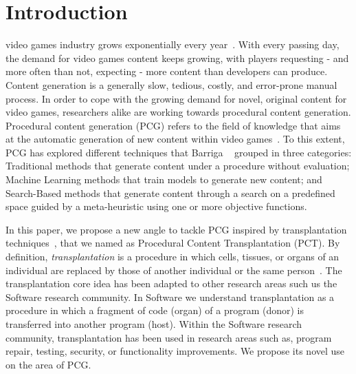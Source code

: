 \section{Introduction}

 video games industry grows exponentially every year~\cite{rykala2020growth}. With every passing day, the demand for video games content keeps growing, with players requesting - and more often than not, expecting - more content than developers can produce. Content generation is a generally slow, tedious, costly, and error-prone manual process. 
In order to cope with the growing demand for novel, original content for video games, researchers alike are working towards procedural content generation. Procedural content generation (PCG) refers to the field of knowledge that aims at the automatic generation of new content within video games~\cite{hendrikx2013procedural}. 
To this extent, PCG has explored different techniques that Barriga \etal~\cite{Barriga2019} grouped in three categories: Traditional methods that generate content under a procedure without evaluation; Machine Learning methods that train models to generate new content; and Search-Based methods that generate content through a search on a predefined space guided by a meta-heuristic using one or more objective functions.


In this paper, we propose a new angle to tackle PCG inspired by transplantation techniques~\cite{barr2015automated}, that we named as Procedural Content Transplantation (PCT). By definition, \textit{transplantation} is a procedure in which cells, tissues, or organs of an individual are replaced by those of another individual or the same person~\cite{FARSHBAFNADI2023599}. The transplantation core idea has been adapted to other research areas such us the Software research community. In Software we understand transplantation as a procedure in which a fragment of code (organ) of a program (donor) is transferred into another program (host). Within the Software research community, transplantation has been used in research areas such as, program repair, testing, security, or functionality improvements. We propose its novel use on the area of PCG.

